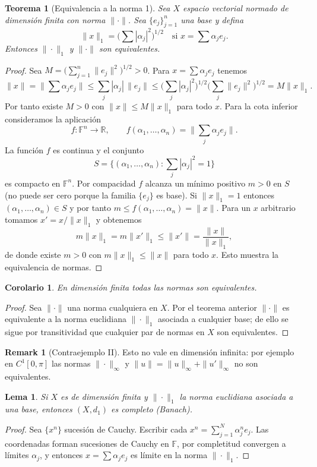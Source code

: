 \documentclass[11pt]{article}
\theoremstyle{definition}
\newtheorem{remark}[definition]{Remark}
\theoremstyle{plain}
\newtheorem{lemma}[definition]{Lema}
\newtheorem{theorem}[definition]{Teorema}
\newtheorem{corollary}[definition]{Corolario}
\begin{document}
\begin{theorem}[Equivalencia a la norma 1]
Sea $X$ espacio vectorial normado de dimensión finita con norma $\|\cdot\|$. Sea $\{e_j\}_{j=1}^n$ una base y defina
$$\|x\|_1=\Big(\sum|\alpha_j|^2\Big)^{1/2}\quad\text{si }x=\sum\alpha_j e_j.$$
Entonces $\|\cdot\|_1$ y $\|\cdot\|$ son equivalentes.
\end{theorem}
\begin{proof}
Sea $M=\big(\sum_{j=1}^n\|e_j\|^2\big)^{1/2}>0$. Para $x=\sum\alpha_j e_j$ tenemos
$$\|x\|=\Big\|\sum\alpha_j e_j\Big\|\le\sum_j|\alpha_j|\,\|e_j\| \le\Big(\sum_j|\alpha_j|^2\Big)^{1/2}\Big(\sum_j\|e_j\|^2\Big)^{1/2}=M\|x\|_1.$$
Por tanto existe $M>0$ con $\|x\|\le M\|x\|_1$ para todo $x$. Para la cota inferior consideramos la aplicación
$$f:\mathbb{F}^n\to\mathbb{R},\qquad f(\alpha_1,\dots,\alpha_n)=\Big\|\sum_j\alpha_j e_j\Big\|.$$ 
La función $f$ es continua y el conjunto
$$S=\{(\alpha_1,\dots,\alpha_n):\sum_j|\alpha_j|^2=1\}$$
es compacto en $\mathbb{F}^n$. Por compacidad $f$ alcanza un mínimo positivo $m>0$ en $S$ (no puede ser cero porque la familia $\{e_j\}$ es base). Si $\|x\|_1=1$ entonces $(\alpha_1,\dots,\alpha_n)\in S$ y por tanto $m\le f(\alpha_1,\dots,\alpha_n)=\|x\|$. Para un $x$ arbitrario tomamos $x'=x/\|x\|_1$ y obtenemos
$$m\|x\|_1 = m\|x'\|_1 \le \|x'\| = \frac{\|x\|}{\|x\|_1},$$
de donde existe $m>0$ con $m\|x\|_1\le\|x\|$ para todo $x$. Esto muestra la equivalencia de normas.
\end{proof}

\begin{corollary}
En dimensión finita todas las normas son equivalentes.
\end{corollary}
\begin{proof}
Sea $\|\cdot\|$ una norma cualquiera en $X$. Por el teorema anterior $\|\cdot\|$ es equivalente a la norma euclidiana $\|\cdot\|_1$ asociada a cualquier base; de ello se sigue por transitividad que cualquier par de normas en $X$ son equivalentes.
\end{proof}

\begin{remark}[Contraejemplo II]
Esto no vale en dimensión infinita: por ejemplo en $C^1[0,\pi]$ las normas $\|\cdot\|_\infty$ y $\|u\|=\|u\|_\infty+\|u'\|_\infty$ no son equivalentes.
\end{remark}

\begin{lemma}
Si $X$ es de dimensión finita y $\|\cdot\|_1$ la norma euclidiana asociada a una base, entonces $(X,d_1)$ es completo (Banach).
\end{lemma}
\begin{proof}
Sea $\{x^n\}$ sucesión de Cauchy. Escribir cada $x^n=\sum_{j=1}^N\alpha_j^n e_j$. Las coordenadas forman sucesiones de Cauchy en $\mathbb{F}$, por completitud convergen a límites $\alpha_j$, y entonces $x=\sum\alpha_j e_j$ es límite en la norma $\|\cdot\|_1$.
\end{proof}
\end{document}
